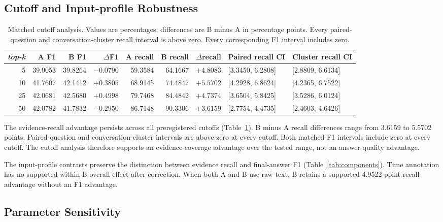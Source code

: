 \documentclass[a4paper,twoside]{article}
\newcommand{\topk}{\textit{top-k}}
\begin{document}
\subsection{Cutoff and Input-profile Robustness}

\begin{table}[t]
\centering
\caption{Matched cutoff analysis. Values are percentages; differences are
B minus A in percentage points. Every paired-question and
conversation-cluster recall interval is above zero. Every corresponding F1
interval includes zero.}
\label{tab:cutoffs}
\begin{tabular}{@{}rrrrrrrll@{}}
\toprule
\topk{} & A F1 & B F1 & \(\Delta\)F1 & A recall & B recall &
\(\Delta\)recall & Paired recall CI & Cluster recall CI \\
\midrule
5  & 39.9053 & 39.8264 & \(-0.0790\) & 59.3584 & 64.1667 & \(+4.8083\) & [3.3450, 6.2808] & [2.8809, 6.6134] \\
10 & 41.7607 & 42.1412 & \(+0.3805\) & 68.9145 & 74.4847 & \(+5.5702\) & [4.2928, 6.8624] & [4.2365, 6.7522] \\
25 & 42.0681 & 42.5680 & \(+0.4998\) & 79.7468 & 84.4842 & \(+4.7374\) & [3.6504, 5.8425] & [3.5286, 6.0124] \\
50 & 42.0782 & 41.7832 & \(-0.2950\) & 86.7148 & 90.3306 & \(+3.6159\) & [2.7754, 4.4735] & [2.4603, 4.6426] \\
\bottomrule
\end{tabular}
\end{table}

The evidence-recall advantage persists across all preregistered cutoffs
(Table~\ref{tab:cutoffs}). B minus A recall differences range from 3.6159 to
5.5702 points. Paired-question and conversation-cluster intervals are above
zero at every cutoff. Both matched F1 intervals include zero at every cutoff.
The cutoff analysis therefore supports an evidence-coverage advantage over the
tested range, not an answer-quality advantage.

The input-profile contrasts preserve the distinction between evidence recall
and final-answer F1 (Table~\ref{tab:components}). Time annotation has no
supported within-B overall effect after correction. When both A and B use raw
text, B retains a supported 4.9522-point recall advantage without an F1
advantage.

\subsection{Parameter Sensitivity}
\end{document}
